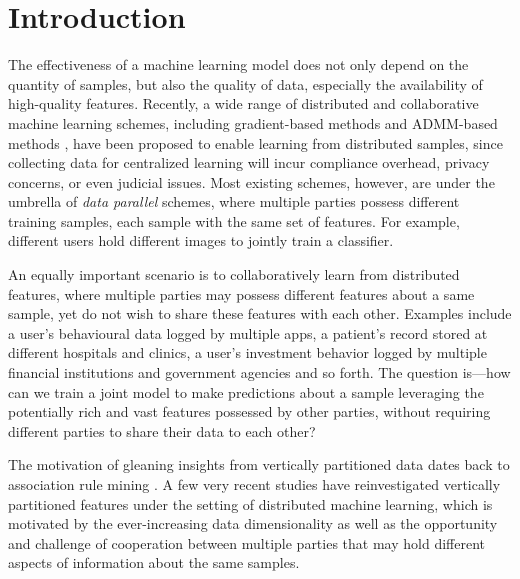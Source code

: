 \section{Introduction}



The effectiveness of a machine learning model does not only depend on the quantity of samples, but also the quality of data, especially the availability of high-quality features.
Recently, a wide range of distributed and collaborative machine learning schemes, including gradient-based methods \cite{li2014scaling, li2014communication, hsieh2017gaia, ho2013more} and ADMM-based methods \cite{zhang2018improving, shi2014linear, zhang2016dual, huang2018dp},
have been proposed to enable learning from distributed samples, since collecting data for centralized learning will incur compliance overhead, privacy concerns, or even judicial issues. Most existing schemes, however, are under the umbrella of \emph{data parallel} schemes, where multiple parties possess different training samples, each sample with the same set of features. 
For example, different users hold different images to jointly train a classifier.

An equally important scenario is to collaboratively learn from distributed features, where multiple parties may possess different features about a same sample, yet do not wish to share these features with each other. Examples include a user's behavioural data logged by multiple apps, a patient's record stored at different hospitals and clinics, a user's investment behavior logged by multiple financial institutions and government agencies and so forth. The question is---how can we train a joint model to make predictions about a sample leveraging the potentially rich and vast features possessed by other parties, without requiring different parties to share their data to each other?

The motivation of gleaning insights from vertically partitioned data dates back to association rule mining \cite{vaidya2002privacy,vaidya2003privacy}. A few very recent studies \cite{kenthapadi2013privacy,ying2018supervised, hu2019fdml, heinze2017preserving,dai2018privacy,stolpe2016sustainable} have reinvestigated vertically partitioned features under the setting of distributed machine learning, which is motivated by the ever-increasing data dimensionality as well as the opportunity and challenge of cooperation between multiple parties that may hold different aspects of information about the same samples. %

